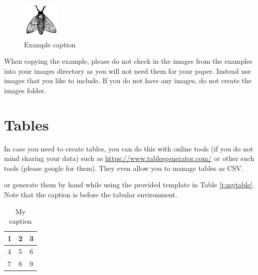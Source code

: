\begin{figure}[!ht]
  \centering\includegraphics[width=\columnwidth]{images/fly.pdf}
  \caption{Example caption}\label{f:fly}
\end{figure}

When copying the example, please do not check in the images from the
examples into your images directory as you will not need them for your
paper. Instead use images that you like to include. If you do not have
any images, do not create the images folder.

\section{Tables}

In case you need to create tables, you can do this with online tools
(if you do not mind sharing your data) such as
\url{https://www.tablesgenerator.com/} or other such tools (please
google for them). They even allow you to manage tables as CSV.

or generate them by hand while using the provided template in Table
\ref{t:mytable}. Note that
the caption is before the tabular environment.

\begin{table}[htb]
\centering
\caption{My caption}
\label{t:mytabble}
\begin{tabular}{lll}
1 & 2 & 3 \\
\hline
4 & 5 & 6 \\
7 & 8 & 9
\end{tabular}
\end{table}

